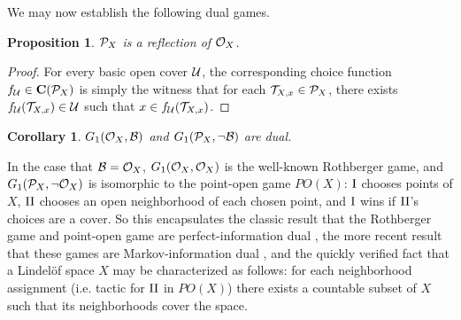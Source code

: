 \documentclass{amsart}
\theoremstyle{plain}
\newtheorem{corollary}[theorem]{Corollary}
\newtheorem{proposition}[theorem]{Proposition}
\theoremstyle{definition}
\theoremstyle{remark}
\theoremstyle{plain}
\theoremstyle{definition}
\theoremstyle{remark}
\begin{document}
%
%
%

We may now establish the following dual games.

\begin{proposition}
  \(\mathcal{P}_X\) is a reflection of \(\mathcal{O}_X\).
\end{proposition}
\begin{proof}
  For every basic open cover \(\mathcal{U}\), the corresponding choice function \(f_{\mathcal{U}}\in\mathbf C(\mathcal{P}_X)\) is simply
  the witness that for each \(\mathcal{T}_{X,x}\in\mathcal{P}_X\), there exists \(f_{\mathcal{U}}(\mathcal{T}_{X,x})\in\mathcal{U}\) such that
  \(x\in f_{\mathcal{U}}(\mathcal{T}_{X,x})\).
\end{proof}

\begin{corollary}\label{coverSel1}
  \(G_{1}(\mathcal{O}_X,\mathcal{B})\) and \(G_{1}(\mathcal{P}_X,\neg\mathcal{B})\) are dual.
\end{corollary}

In the case that \(\mathcal{B}=\mathcal{O}_X\), \(G_{1}(\mathcal{O}_X,\mathcal{O}_X)\) is the well-known Rothberger game,
and \(G_{1}(\mathcal{P}_X,\neg\mathcal{O}_X)\) is isomorphic
to the point-open game \(PO(X)\): \(\mathrm{I}\) chooses points of \(X\), \(\mathrm{II}\) chooses an open neighborhood
of each chosen point, and \(\mathrm{I}\) wins if \(\mathrm{II}\)'s choices are a cover.
So this encapsulates the classic result that the Rothberger game and
point-open game are perfect-information dual \cite{MR0493925}, the more recent result that
these games are Markov-information dual \cite{CLONTZ2019106815}, and the quickly verified fact that
a Lindel\"of space \(X\) may be characterized as follows: for each neighborhood assignment (i.e.
tactic for \(\mathrm{II}\) in \(PO(X)\)) there exists a countable subset
of \(X\) such that its neighborhoods cover the space.
\end{document}

